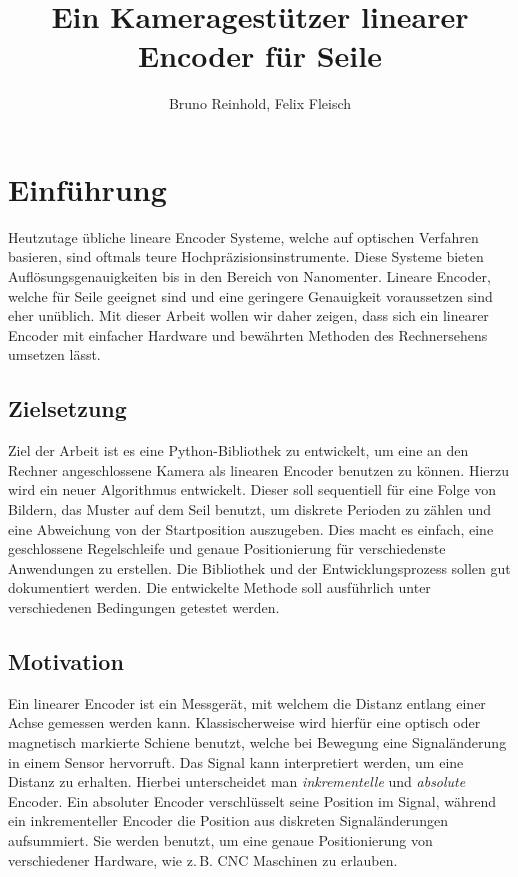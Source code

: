 \documentclass[10pt,a4paper]{scrarticle}
\title{Ein Kameragestützer linearer Encoder für Seile}
\author{Bruno Reinhold, Felix Fleisch}
\begin{document}
	\maketitle
	\newpage
    \tableofcontents
\section{Einführung}
Heutzutage übliche lineare Encoder Systeme, welche auf optischen Verfahren basieren, sind oftmals teure Hochpräzisionsinstrumente. Diese Systeme bieten Auflösungsgenauigkeiten bis in den Bereich von Nanomenter. Lineare Encoder, welche für Seile geeignet sind und eine geringere Genauigkeit voraussetzen sind eher unüblich. Mit dieser Arbeit wollen wir daher zeigen, dass sich ein linearer Encoder mit einfacher Hardware und bewährten Methoden des Rechnersehens umsetzen lässt.

\subsection{Zielsetzung}\label{Zielsetzung}
Ziel der Arbeit ist es eine Python-Bibliothek zu entwickelt, um eine an den Rechner angeschlossene Kamera als linearen Encoder benutzen zu können. Hierzu wird ein neuer Algorithmus entwickelt. Dieser soll sequentiell für eine Folge von Bildern, das Muster auf dem Seil benutzt, um diskrete Perioden zu zählen und eine Abweichung von der Startposition auszugeben. %
Dies macht es einfach, eine geschlossene Regelschleife und genaue Positionierung für verschiedenste Anwendungen zu erstellen.
Die Bibliothek und der Entwicklungsprozess sollen gut dokumentiert werden.
Die entwickelte Methode soll ausführlich unter verschiedenen Bedingungen getestet werden.


\subsection{Motivation}\label{Motivation}
Ein linearer Encoder ist ein Messgerät, mit welchem die Distanz entlang einer Achse gemessen werden kann. Klassischerweise wird hierfür eine optisch oder magnetisch markierte Schiene benutzt, welche bei Bewegung eine Signaländerung in einem Sensor hervorruft. Das Signal kann interpretiert werden, um eine Distanz zu erhalten. Hierbei unterscheidet man \textit{inkrementelle} und \textit{absolute} Encoder. Ein absoluter Encoder verschlüsselt seine Position im Signal, während ein inkrementeller Encoder die Position aus diskreten Signaländerungen aufsummiert. Sie werden benutzt, um eine genaue Positionierung von verschiedener Hardware, wie z.\,B. CNC Maschinen zu erlauben.
\end{document}
